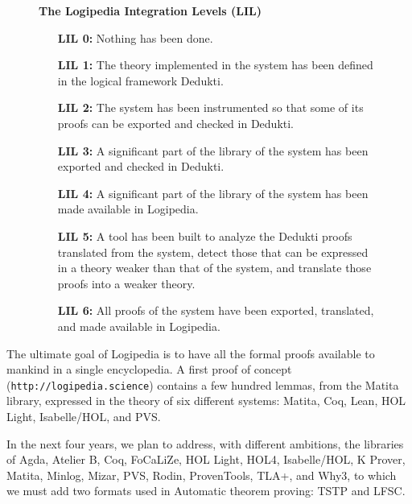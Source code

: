 \begin{figure}[ht]
\begin{shaded}
\begin{center}
{\bf \Large The Logipedia Integration Levels (LIL)\label{lil}}
\end{center}

\begin{itemize}
\item[\bf LIL 0:] Nothing has been done.

\item[\bf LIL 1:] The theory implemented in the system has been defined in
  the logical framework Dedukti.

\item[\bf LIL 2:] The system has been instrumented so that some of its proofs
  can be exported and checked in Dedukti.

\item[\bf LIL 3:] A significant part of the library of the system has been
  exported and checked in Dedukti.

\item[\bf LIL 4:] A significant part of the library of the system has
  been made available in Logipedia.

\item[\bf LIL 5:] A tool has been built to analyze the Dedukti proofs
  translated from the system, detect those that can be expressed in a theory
  weaker than that of the system, and translate those proofs into a
  weaker theory.

\item[\bf LIL 6:] All proofs of the system have been exported, translated,
  and made available in Logipedia.
\end{itemize}
\end{shaded}
\end{figure}

The ultimate goal of Logipedia is to have all the formal proofs
available to mankind in a single encyclopedia.  A first proof of
concept ({\tt http://logipedia.science}) contains a few hundred
lemmas, from the Matita library, expressed in the theory of six
different systems: Matita, Coq, Lean, HOL Light, Isabelle/HOL, and
PVS.

In the next four years, we plan to address, with different ambitions,
the libraries of Agda, Atelier B, Coq, FoCaLiZe, HOL Light, HOL4,
Isabelle/HOL, K Prover, Matita, Minlog, Mizar, PVS, Rodin,
ProvenTools, TLA+, and Why3, to which we must add two formats used in
Automatic theorem proving: TSTP and LFSC.


